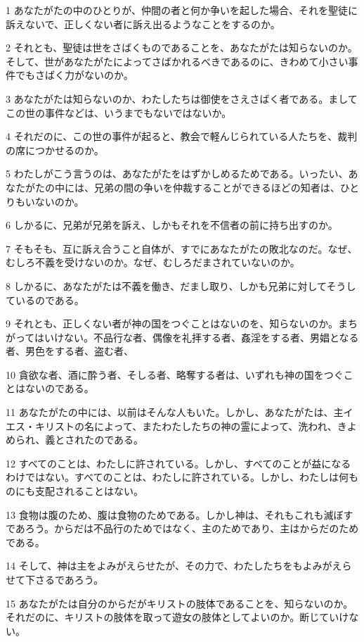 \par 1 あなたがたの中のひとりが、仲間の者と何か争いを起した場合、それを聖徒に訴えないで、正しくない者に訴え出るようなことをするのか。
\par 2 それとも、聖徒は世をさばくものであることを、あなたがたは知らないのか。そして、世があなたがたによってさばかれるべきであるのに、きわめて小さい事件でもさばく力がないのか。
\par 3 あなたがたは知らないのか、わたしたちは御使をさえさばく者である。ましてこの世の事件などは、いうまでもないではないか。
\par 4 それだのに、この世の事件が起ると、教会で軽んじられている人たちを、裁判の席につかせるのか。
\par 5 わたしがこう言うのは、あなたがたをはずかしめるためである。いったい、あなたがたの中には、兄弟の間の争いを仲裁することができるほどの知者は、ひとりもいないのか。
\par 6 しかるに、兄弟が兄弟を訴え、しかもそれを不信者の前に持ち出すのか。
\par 7 そもそも、互に訴え合うこと自体が、すでにあなたがたの敗北なのだ。なぜ、むしろ不義を受けないのか。なぜ、むしろだまされていないのか。
\par 8 しかるに、あなたがたは不義を働き、だまし取り、しかも兄弟に対してそうしているのである。
\par 9 それとも、正しくない者が神の国をつぐことはないのを、知らないのか。まちがってはいけない。不品行な者、偶像を礼拝する者、姦淫をする者、男娼となる者、男色をする者、盗む者、
\par 10 貪欲な者、酒に酔う者、そしる者、略奪する者は、いずれも神の国をつぐことはないのである。
\par 11 あなたがたの中には、以前はそんな人もいた。しかし、あなたがたは、主イエス・キリストの名によって、またわたしたちの神の霊によって、洗われ、きよめられ、義とされたのである。
\par 12 すべてのことは、わたしに許されている。しかし、すべてのことが益になるわけではない。すべてのことは、わたしに許されている。しかし、わたしは何ものにも支配されることはない。
\par 13 食物は腹のため、腹は食物のためである。しかし神は、それもこれも滅ぼすであろう。からだは不品行のためではなく、主のためであり、主はからだのためである。
\par 14 そして、神は主をよみがえらせたが、その力で、わたしたちをもよみがえらせて下さるであろう。
\par 15 あなたがたは自分のからだがキリストの肢体であることを、知らないのか。それだのに、キリストの肢体を取って遊女の肢体としてよいのか。断じていけない。
